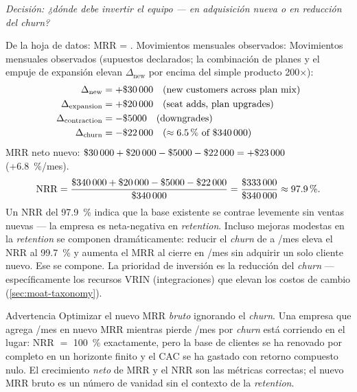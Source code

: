 \begin{example}
\emph{Decisión: ¿dónde debe invertir el equipo --- en adquisición nueva o en reducción del
\emph{churn}?}

De la hoja de datos: MRR = . Movimientos mensuales observados:
Movimientos mensuales observados (supuestos declarados; la combinación de planes y el empuje
de expansión elevan \(\Delta_{\text{new}}\) por encima del simple producto
\num{200}\(\times\)):
\[
  \begin{aligned}
    \Delta_{\text{new}} &= +\$\num{30000} \quad (\text{new customers across plan mix})\\
    \Delta_{\text{expansion}} &= +\$\num{20000} \quad (\text{seat adds, plan upgrades})\\
    \Delta_{\text{contraction}} &= -\$\num{5000} \quad (\text{downgrades})\\
    \Delta_{\text{churn}} &= -\$\num{22000} \quad (\approx\qty{6.5}{\percent}\text{ of }\$\num{340000})
  \end{aligned}
\]
MRR neto nuevo: $\$\num{30000}+\$\num{20000}-\$\num{5000}-\$\num{22000}=+\$\num{23000}$
(+\qty{6.8}{\percent}/mes).
\[
  \mathrm{NRR} = \frac{\$\num{340000}+\$\num{20000}-\$\num{5000}-\$\num{22000}}{\$\num{340000}}
               = \frac{\$\num{333000}}{\$\num{340000}} \approx \qty{97.9}{\percent}.
\]
Un NRR del \qty{97.9}{\percent} indica que la base existente se contrae levemente sin ventas
nuevas --- la empresa es neta-negativa en \emph{retention}. Incluso mejoras modestas en la
\emph{retention} se componen dramáticamente: reducir el \emph{churn} de  a
/mes eleva el NRR al \qty{99.7}{\percent} y aumenta el MRR al cierre en
/mes sin adquirir un solo cliente nuevo. Ese  se compone. La
prioridad de inversión es la reducción del \emph{churn} --- específicamente los recursos
VRIN (integraciones) que elevan los costos de cambio (\cref{sec:moat-taxonomy}).
\end{example}

\begin{admonition}{Advertencia}
Optimizar el nuevo MRR \emph{bruto} ignorando el \emph{churn}. Una empresa que agrega
/mes en nuevo MRR mientras pierde /mes por \emph{churn} está
corriendo en el lugar: NRR $=$ \qty{100}{\percent} exactamente, pero la base de clientes se
ha renovado por completo en un horizonte finito y el CAC se ha gastado con retorno compuesto
nulo. El crecimiento \emph{neto} de MRR y el NRR son las métricas correctas; el nuevo MRR
bruto es un número de vanidad sin el contexto de la \emph{retention}.
\end{admonition}

